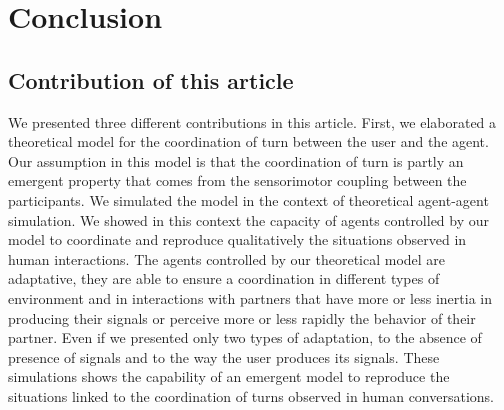 \section{Conclusion}

\subsection{Contribution of this article}

We presented three different contributions in this article. First, we elaborated a theoretical model for the coordination of turn between the user and the agent. Our assumption in this model is that the coordination of turn is partly an emergent property that comes from the sensorimotor coupling between the participants. We simulated the model in the context of theoretical agent-agent simulation. We showed in this context the capacity of agents controlled by our model to coordinate and reproduce qualitatively the situations observed in human interactions. The agents controlled by our theoretical model are adaptative, they are able to ensure a coordination in different types of environment and in interactions with partners that have more or less inertia in producing their signals or perceive more or less rapidly the behavior of their partner. Even if we presented only two types of adaptation, to the absence of presence of signals and to the way the user produces its signals. These simulations shows the capability of an emergent model to reproduce the situations linked to the coordination of turns observed in human conversations.

